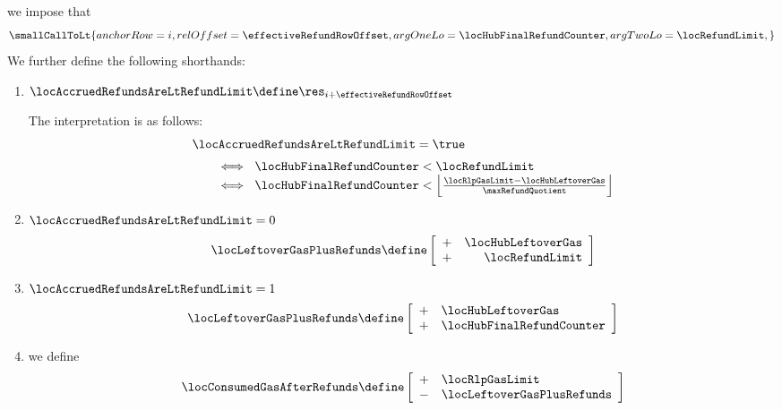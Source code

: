 \item[\underline{\underline{Row n$°(i + \effectiveRefundRowOffset)$: Effective refund:}}]
	we impose that
	\[
		\smallCallToLt {
			anchorRow = i                         ,
			relOffset = \effectiveRefundRowOffset ,
			argOneLo  = \locHubFinalRefundCounter ,
			argTwoLo  = \locRefundLimit           ,
		}
	\]
	We further define the following shorthands:
	\begin{enumerate}
		\item $\locAccruedRefundsAreLtRefundLimit \define \res_{i + \effectiveRefundRowOffset}$

			\saNote{}
			The interpretation is as follows:
			\[
				\begin{array}{l}
					\locAccruedRefundsAreLtRefundLimit = \true \vspace{2mm}                                                                          \\
					\qquad \iff ~ \locHubFinalRefundCounter < \locRefundLimit                                                                        \\
					\qquad \iff ~ \locHubFinalRefundCounter < \left\lfloor\frac{\locRlpGasLimit - \locHubLeftoverGas}\maxRefundQuotient\right\rfloor \\
				\end{array}
			\]
		\item \If $\locAccruedRefundsAreLtRefundLimit = 0$ \Then
			\[
				\locLeftoverGasPlusRefunds \define
				\left[ \begin{array}{cr}
					+ & \locHubLeftoverGas \\
					+ & \locRefundLimit    \\
				\end{array} \right]
			\]
		\item \If $\locAccruedRefundsAreLtRefundLimit = 1$ \Then
			\[
				\locLeftoverGasPlusRefunds \define
				\left[ \begin{array}{cl}
					+ & \locHubLeftoverGas        \\
					+ & \locHubFinalRefundCounter \\
				\end{array} \right]
			\]
		\item we define
			\[
				\locConsumedGasAfterRefunds \define
				\left[ \begin{array}{cl}
					+ & \locRlpGasLimit            \\
					- & \locLeftoverGasPlusRefunds \\
				\end{array} \right]
			\]
	\end{enumerate}
